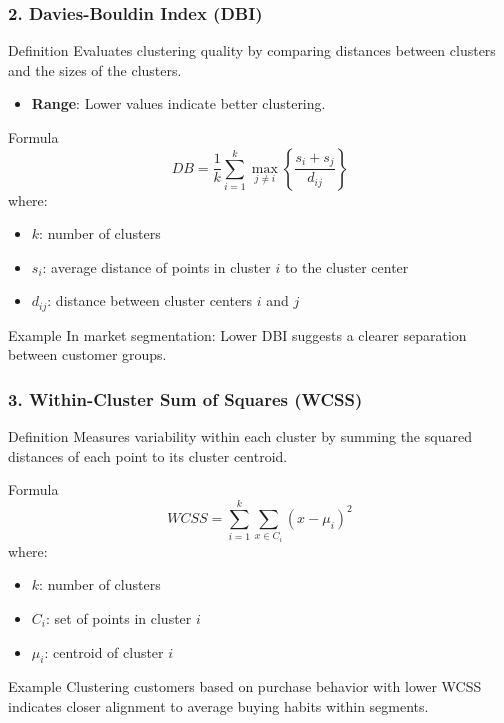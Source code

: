 \documentclass[aspectratio=169]{beamer}
\begin{document}
\begin{frame}[fragile]
    \frametitle{2. Davies-Bouldin Index (DBI)}
    \begin{block}{Definition}
        Evaluates clustering quality by comparing distances between clusters and the sizes of the clusters.
    \end{block}
    \begin{itemize}
        \item \textbf{Range}: Lower values indicate better clustering.
    \end{itemize}
    
    \begin{block}{Formula}
        \[
        DB = \frac{1}{k} \sum_{i=1}^{k} \max_{j \neq i}\left\{ \frac{s_i + s_j}{d_{ij}} \right\}
        \]
        where:
        \begin{itemize}
            \item \(k\): number of clusters
            \item \(s_i\): average distance of points in cluster \(i\) to the cluster center
            \item \(d_{ij}\): distance between cluster centers \(i\) and \(j\)
        \end{itemize}
    \end{block}
    
    \begin{block}{Example}
        In market segmentation: Lower DBI suggests a clearer separation between customer groups.
    \end{block}
\end{frame}

\begin{frame}[fragile]
    \frametitle{3. Within-Cluster Sum of Squares (WCSS)}
    \begin{block}{Definition}
        Measures variability within each cluster by summing the squared distances of each point to its cluster centroid.
    \end{block}
    
    \begin{block}{Formula}
        \[
        WCSS = \sum_{i=1}^{k} \sum_{x \in C_i} (x - \mu_i)^2
        \]
        where:
        \begin{itemize}
            \item \(k\): number of clusters
            \item \(C_i\): set of points in cluster \(i\)
            \item \(\mu_i\): centroid of cluster \(i\)
        \end{itemize}
    \end{block}
    
    \begin{block}{Example}
        Clustering customers based on purchase behavior with lower WCSS indicates closer alignment to average buying habits within segments.
    \end{block}
\end{frame}
\end{document}
